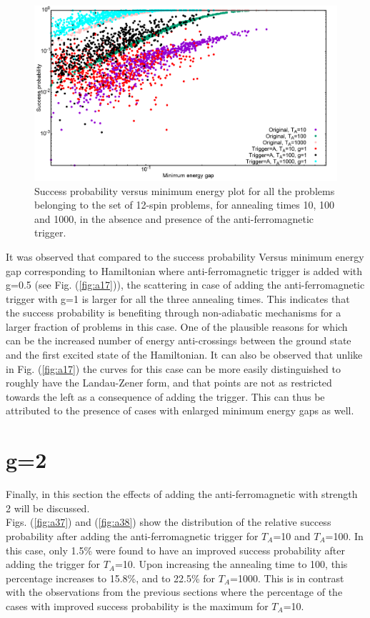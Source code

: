 \documentclass[../main.tex]{subfiles}
\begin{document}
\begin{figure}[H]
\centering 
\includegraphics[scale=0.24]{SuccVsGap_OA_g1.png}
\caption{Success probability versus minimum energy plot for all the problems belonging to the set of 12-spin problems, for annealing times 10, 100 and 1000, in the absence and presence of the anti-ferromagnetic trigger.}
\label{fig:a36}
\end{figure}

It was observed that compared to the success probability Versus minimum energy gap corresponding to Hamiltonian where anti-ferromagnetic trigger is added with g=0.5 (see Fig. (\ref{fig:a17})), the scattering in case of adding the anti-ferromagnetic trigger with g=1 is larger for all the three annealing times. This indicates that the success probability is benefiting through non-adiabatic mechanisms for a larger fraction of problems in this case. One of the plausible reasons for which can be the increased number of energy anti-crossings between the ground state and the first excited state of the Hamiltonian. It can also be observed that unlike in Fig. (\ref{fig:a17}) the curves for this case can be more easily distinguished to roughly have the Landau-Zener form, and that points are not as restricted towards the left as a consequence of adding the trigger. This can thus be attributed to the presence of cases with enlarged minimum energy gaps as well.


\section*{g=2}
Finally, in this section the effects of adding the anti-ferromagnetic with strength 2 will be discussed.\\
Figs. (\ref{fig:a37}) and (\ref{fig:a38}) show the distribution of the relative success probability after adding the anti-ferromagnetic trigger for $T_A$=10 and $T_A$=100. In this case, only 1.5\% were found to have an improved success probability after adding the trigger for $T_A$=10. Upon increasing the annealing time to 100, this percentage increases to 15.8\%, and to 22.5\% for $T_A$=1000. This is in contrast with the observations from the previous sections where the percentage of the cases with improved success probability is the maximum for $T_A$=10. 
\end{document}
